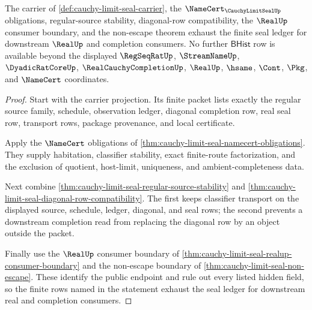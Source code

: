 \begin{theorem}
\label{thm:cauchy-limit-seal-seal-ledger-exhaustion}
The carrier of \autoref{def:cauchy-limit-seal-carrier}, the $\NameCert_{\CauchyLimitSealUp}$ obligations, regular-source stability, diagonal-row compatibility, the $\RealUp$ consumer boundary, and the non-escape theorem exhaust the finite seal ledger for downstream $\RealUp$ and completion consumers. No further $\mathsf{BHist}$ row is available beyond the displayed $\RegSeqRatUp$, $\StreamNameUp$, $\DyadicRatCoreUp$, $\RealCauchyCompletionUp$, $\RealUp$, $\hsame$, $\Cont$, $\Pkg$, and $\NameCert$ coordinates.
\end{theorem}
\begin{proof}
Start with the carrier projection. Its finite packet lists exactly the regular source family, schedule, observation ledger, diagonal completion row, real seal row, transport rows, package provenance, and local certificate.

Apply the $\NameCert$ obligations of \autoref{thm:cauchy-limit-seal-namecert-obligations}. They supply habitation, classifier stability, exact finite-route factorization, and the exclusion of quotient, host-limit, uniqueness, and ambient-completeness data.

Next combine \autoref{thm:cauchy-limit-seal-regular-source-stability} and \autoref{thm:cauchy-limit-seal-diagonal-row-compatibility}. The first keeps classifier transport on the displayed source, schedule, ledger, diagonal, and seal rows; the second prevents a downstream completion read from replacing the diagonal row by an object outside the packet.

Finally use the $\RealUp$ consumer boundary of \autoref{thm:cauchy-limit-seal-realup-consumer-boundary} and the non-escape boundary of \autoref{thm:cauchy-limit-seal-non-escape}. These identify the public endpoint and rule out every listed hidden field, so the finite rows named in the statement exhaust the seal ledger for downstream real and completion consumers.
\end{proof}


